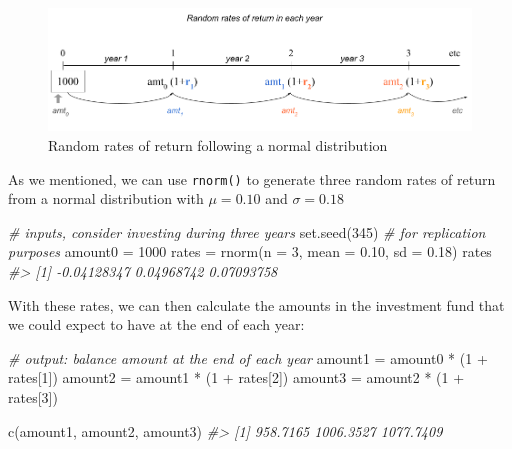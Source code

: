 \documentclass[
]{book}
\newenvironment{Shaded}{\begin{snugshade}}{\end{snugshade}}
\newcommand{\AttributeTok}[1]{\textcolor[rgb]{0.77,0.63,0.00}{#1}}
\newcommand{\CommentTok}[1]{\textcolor[rgb]{0.56,0.35,0.01}{\textit{#1}}}
\newcommand{\DecValTok}[1]{\textcolor[rgb]{0.00,0.00,0.81}{#1}}
\newcommand{\FloatTok}[1]{\textcolor[rgb]{0.00,0.00,0.81}{#1}}
\newcommand{\FunctionTok}[1]{\textcolor[rgb]{0.00,0.00,0.00}{#1}}
\newcommand{\NormalTok}[1]{#1}
\newcommand{\OtherTok}[1]{\textcolor[rgb]{0.56,0.35,0.01}{#1}}
\newcommand{\SpecialCharTok}[1]{\textcolor[rgb]{0.00,0.00,0.00}{#1}}
\begin{document}
\begin{figure}

{\centering \includegraphics[width=0.95\linewidth]{images/iterations/timeline-investment-stock-market2} 

}

\caption{Random rates of return following a normal distribution}\label{fig:unnamed-chunk-239}
\end{figure}

As we mentioned, we can use \texttt{rnorm()} to generate three random rates of return
from a normal distribution with \(\mu = 0.10\) and \(\sigma = 0.18\)

\begin{Shaded}
\begin{Highlighting}[]
\CommentTok{\# inputs, consider investing during three years}
\FunctionTok{set.seed}\NormalTok{(}\DecValTok{345}\NormalTok{)   }\CommentTok{\# for replication purposes}
\NormalTok{amount0 }\OtherTok{=} \DecValTok{1000}
\NormalTok{rates }\OtherTok{=} \FunctionTok{rnorm}\NormalTok{(}\AttributeTok{n =} \DecValTok{3}\NormalTok{, }\AttributeTok{mean =} \FloatTok{0.10}\NormalTok{, }\AttributeTok{sd =} \FloatTok{0.18}\NormalTok{)}
\NormalTok{rates}
\CommentTok{\#\textgreater{} [1] {-}0.04128347  0.04968742  0.07093758}
\end{Highlighting}
\end{Shaded}

With these rates, we can then calculate the amounts in the investment fund that
we could expect to have at the end of each year:

\begin{Shaded}
\begin{Highlighting}[]
\CommentTok{\# output: balance amount at the end of each year}
\NormalTok{amount1 }\OtherTok{=}\NormalTok{ amount0 }\SpecialCharTok{*}\NormalTok{ (}\DecValTok{1} \SpecialCharTok{+}\NormalTok{ rates[}\DecValTok{1}\NormalTok{])}
\NormalTok{amount2 }\OtherTok{=}\NormalTok{ amount1 }\SpecialCharTok{*}\NormalTok{ (}\DecValTok{1} \SpecialCharTok{+}\NormalTok{ rates[}\DecValTok{2}\NormalTok{])}
\NormalTok{amount3 }\OtherTok{=}\NormalTok{ amount2 }\SpecialCharTok{*}\NormalTok{ (}\DecValTok{1} \SpecialCharTok{+}\NormalTok{ rates[}\DecValTok{3}\NormalTok{])}

\FunctionTok{c}\NormalTok{(amount1, amount2, amount3)}
\CommentTok{\#\textgreater{} [1]  958.7165 1006.3527 1077.7409}
\end{Highlighting}
\end{Shaded}
\end{document}
